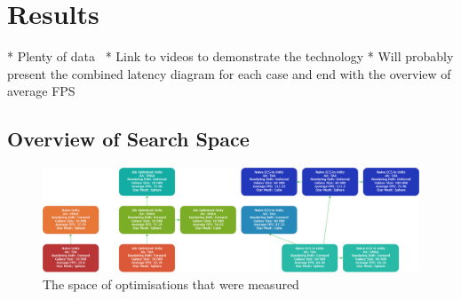 \section{Results}
* Plenty of data~\cite{projectSpreadsheet}
* Link to videos to demonstrate the technology
* Will probably present the combined latency diagram for each case and end with the overview of average FPS

\subsection{Overview of Search Space}
\begin{figure}[tbph]
    \centering
    \includegraphics[width=1\textwidth]{Figures/SearchSpace.png}
    \caption[Optimisation Search Space And Combinations]{The space of optimisations that were measured}
    \label{fig:searchspace}
\end{figure}